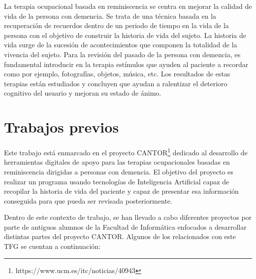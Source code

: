 La terapia ocupacional basada en reminiscencia se centra en mejorar la calidad de vida de la persona con demencia. Se trata de una técnica basada en la recuperación de recuerdos dentro de un periodo de tiempo en la vida de la persona con el objetivo de construir la historia de vida del sujeto. La historia de vida surge de la sucesión de acontecimientos que componen la totalidad de la vivencia del sujeto. Para la revisión del pasado de la persona con demencia, es fundamental introducir en la terapia estímulos que ayuden al paciente a recordar como por ejemplo, fotografías, objetos, música, etc. Los resultados de estas terapias están estudiados y concluyen que ayudan a ralentizar el deterioro cognitivo del usuario y mejoran su estado de ánimo.


\section{Trabajos previos}

Este trabajo está enmarcado en el proyecto CANTOR\footnote{https://www.ucm.es/itc/noticias/40943} dedicado al desarrollo de herramientas digitales de apoyo para las terapias ocupacionales basadas en reminiscencia dirigidas a personas con demencia. El objetivo del proyecto es realizar un programa usando tecnologías de Inteligencia Artificial capaz de recopilar la historia de vida del paciente y capaz de presentar esa información conseguida para que pueda ser revisada posteriormente. 

Dentro de este contexto de trabajo, se han llevado a cabo diferentes proyectos por parte de antiguos alumnos de la Facultad de Informática enfocados a desarrollar distintas partes del proyecto CANTOR. Algunos de los relacionados con este TFG se cuentan a continuación: 

